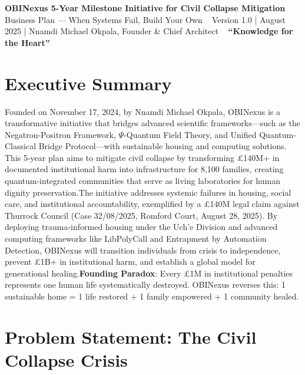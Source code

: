 \documentclass[12pt]{article}\usepackage[a4paper,margin=1in]{geometry}
\begin{document}
\begin{center}
    {\LARGE \textbf{OBINexus 5-Year Milestone Initiative for Civil Collapse Mitigation}} \
    \vspace{0.5em}
    {\large Business Plan --- When Systems Fail, Build Your Own} \
    \vspace{0.5em}
    {\large Version 1.0 | August 2025 | Nnamdi Michael Okpala, Founder & Chief Architect} \
    \vspace{1em}
    {\textbf{``Knowledge for the Heart''}} \
\end{center}\section*{Executive Summary}
Founded on November 17, 2024, by Nnamdi Michael Okpala, OBINexus is a transformative initiative that bridges advanced scientific frameworks—such as the Negatron-Positron Framework, $\Psi$-Quantum Field Theory, and Unified Quantum-Classical Bridge Protocol—with sustainable housing and computing solutions. This 5-year plan aims to mitigate civil collapse by transforming £140M+ in documented institutional harm into infrastructure for 8,100 families, creating quantum-integrated communities that serve as living laboratories for human dignity preservation.The initiative addresses systemic failures in housing, social care, and institutional accountability, exemplified by a £140M legal claim against Thurrock Council (Case 32/08/2025, Romford Court, August 28, 2025). By deploying trauma-informed housing under the Uch'e Division and advanced computing frameworks like LibPolyCall and Entrapment by Automation Detection, OBINexus will transition individuals from crisis to independence, prevent £1B+ in institutional harm, and establish a global model for generational healing.\textbf{Founding Paradox}: Every £1M in institutional penalties represents one human life systematically destroyed. OBINexus reverses this: 1 sustainable home = 1 life restored + 1 family empowered + 1 community healed.\section*{Problem Statement: The Civil Collapse Crisis}
\end{document}
